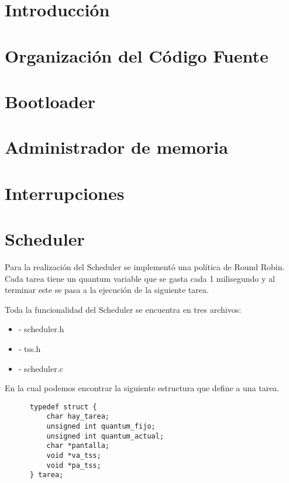 \documentclass[a4paper,10pt]{article}
\begin{document}
\tableofcontents

\newpage


\section*{Introducci\'on}


\section*{Organizaci\'on del C\'odigo Fuente}


\section*{Bootloader}


\section*{Administrador de memoria}


\section*{Interrupciones}


\section*{Scheduler}

Para la realizaci\'on del Scheduler se implement\'o una pol\'itica de Round Robin. Cada tarea tiene un quantum variable que se gasta cada 1 milisegundo y al terminar este se pasa a la ejecuci\'on de la siguiente tarea.

Toda la funcionalidad del Scheduler se encuentra en tres archivos:
\begin{itemize}
\item	- scheduler.h
\item	- tss.h
\item	- scheduler.c
\end{itemize}

En la cual podemos encontrar la siguiente estructura que define a una tarea.

\begin{verbatim}
      typedef struct {
          char hay_tarea;						
          unsigned int quantum_fijo;			
          unsigned int quantum_actual;		
          char *pantalla;					
          void *va_tss;						
          void *pa_tss;						
      } tarea;
\end{verbatim}
\end{document}
